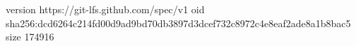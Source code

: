 version https://git-lfs.github.com/spec/v1
oid sha256:dcd6264c214fd00d9ad9bd70db3897d3dcef732c8972c4e8eaf2ade8a1b8bac5
size 174916
